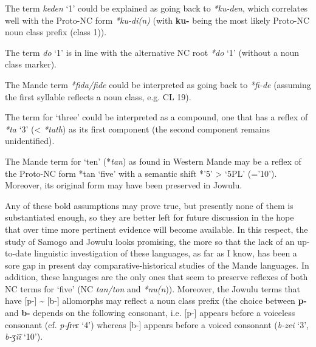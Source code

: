 The term \textit{keden} ‘1’ could be explained as going back to \textit{*ku-den}, which correlates well with the Proto-NC form \textit{*ku-di(n)} (with \textbf{ku-} being the most likely Proto-NC noun class prefix (class 1)). 

The term \textit{do} ‘1’ is in line with the alternative NC root \textit{*do} ‘1’ (without a noun class marker).

The Mande term \textit{*fida/fide} could be interpreted as going back to \textit{*fi}\textit{-}\textit{de} (assuming the first syllable reflects a noun class, e.g. CL 19).

The term for ‘three’ could be interpreted as a compound, one that has a reflex of \textit{*ta} ‘3’ (< \textit{*tath}) as its first component (the second component remains unidentified).  

The Mande term for ‘ten’ (*\textit{tan}) as found in Western Mande may be a reflex of the Proto-NC form *tan ‘five’ with a semantic shift *’5’ > ‘5PL’ (=’10’). Moreover, its original form may have been preserved in Jowulu. 

Any of these bold assumptions may prove true, but presently none of them is substantiated enough, so they are better left for future discussion in the hope that over time more pertinent evidence will become available. In this respect, the study of Samogo and Jowulu looks promising, the more so that the lack of an up-to-date linguistic investigation of these languages, as far as I know, has been a sore gap in present day comparative-historical studies of the Mande languages. In addition, these languages are the only ones that seem to preserve reflexes of both NC terms for ‘five’ (NC \textit{tan/ton} and \textit{*nu}\textit{(n})). Moreover, the Jowulu terms that have [p-] {\textasciitilde} [b-] allomorphs may reflect a noun class prefix (the choice between \textbf{p-} and \textbf{b-} depends on the following consonant, i.e. [p-] appears before a voiceless consonant (cf. \textit{p-ʃɪrɛ} ‘4’) whereas [b-] appears before a voiced consonant (\textit{b-zei} ‘3’, \textit{b-ʒ{\~{i}}{\~{i}}} ‘10’).

